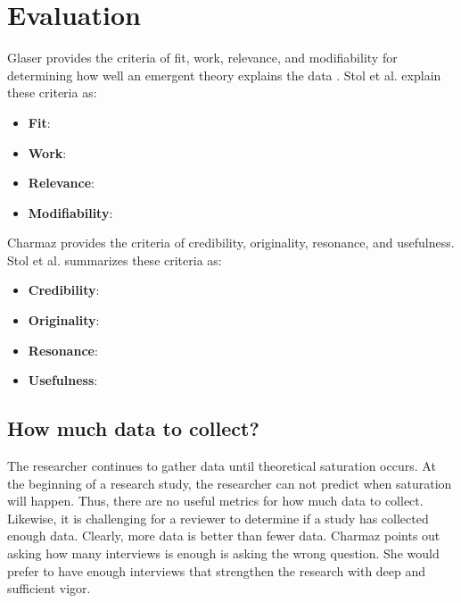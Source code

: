 \section{Evaluation}
Glaser provides the criteria of fit, work, relevance, and modifiability for determining how well an emergent theory explains the data \cite{GlaserTheoreticalSensitivity}. Stol et al.  \cite{StolGroundedTheory} explain these criteria as:
\begin{itemize}
\item \textbf{Fit}:  
\item \textbf{Work}:   
\item\textbf{Relevance}:  
\item \textbf{Modifiability}:  
\end{itemize}

Charmaz provides the criteria of credibility, originality, resonance, and usefulness. Stol et al.  \cite{StolGroundedTheory} summarizes these criteria as:
\begin{itemize}
\item \textbf{Credibility}:  
\item \textbf{Originality}:   
\item\textbf{Resonance}:  
\item \textbf{Usefulness}:  
\end{itemize}
\subsection{How much data to collect?}
The researcher continues to gather data until theoretical saturation occurs. At the beginning of a research study, the researcher can not predict when saturation will happen. Thus, there are no useful metrics for how much data to collect. Likewise, it is challenging for a reviewer to determine if a study has collected enough data. Clearly, more data is better than fewer data. Charmaz points out asking how many interviews is enough is asking the wrong question. She would prefer to have enough interviews that strengthen the research with deep and sufficient vigor. 

